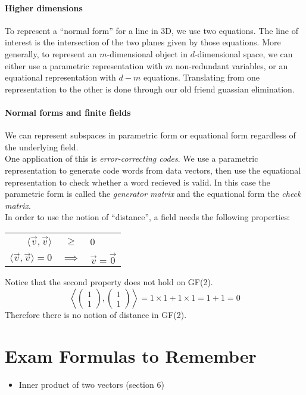 \documentclass{article}
\begin{document}
\paragraph{Higher dimensions} To represent a ``normal form'' for a line in 3D, we use two equations. The line of interest is the intersection of the two planes given by those equations. More generally, to represent an $m$-dimensional object in $d$-dimensional space, we can either use a parametric representation with $m$ non-redundant variables, or an equational representation with $d-m$ equations. Translating from one representation to the other is done through our old friend guassian elimination.

\paragraph{Normal forms and finite fields} We can represent subspaces in parametric form or equational form regardless of the underlying field.
\vspace{1mm}\\
One application of this is \textit{error-correcting codes}. We use a parametric representation to generate code words from data vectors, then use the equational representation to check whether a word recieved is valid. In this case the parametric form is called the \textit{generator matrix} and the equational form the \textit{check matrix}.
\vspace{1mm}\\
In order to use the notion of ``distance'', a field needs the following properties:
\begin{center}
\begin{tabular}{r c l}
$\langle\vec{v},\vec{v}\rangle$ & $\geq$ & 0\\
$\langle\vec{v},\vec{v}\rangle=0$ & $\implies$ & $\vec{v}=\vec{0}$
\end{tabular}
\end{center}
Notice that the second property does not hold on GF(2).
$$\left\langle\begin{pmatrix}1\\1\end{pmatrix},\begin{pmatrix}1\\1\end{pmatrix}\right\rangle=1\times 1+1\times 1=1+1=0$$
Therefore there is no notion of distance in GF(2).

\section{Exam Formulas to Remember}
\begin{itemize}
\item Inner product of two vectors (section 6)
\end{itemize}
\end{document}
